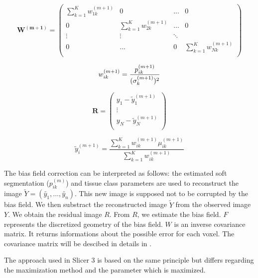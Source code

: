 \begin{itemize}
\begin{itemize}
  \begin{equation*}
   \mathbf{W^{(m+1)}} = \left(
  \begin{array}{clcr}
   \sum_{k=1}^K w_{1k}^{(m+1)} & 0 & \ldots & 0 \\
   0 & \sum_{k=1}^K w_{2k}^{(m+1)} & \ldots & 0 \\
   \vdots & \vdots & \ddots \\
   0 &  \ldots & 0 & \sum_{k=1}^K w_{Nk}^{(m+1)} \\
  \end{array} \right)
  \end{equation*}

  \begin{equation*}
  w_{ik}^{(m+1)}  = \frac{p_{ik}^{(m+1)}}{(\sigma_k^{(m+1)})^2}\\
  \end{equation*}
  
  \begin{equation*}
   \mathbf{R} = \left(
  \begin{array}{cl}
   y_1 - \tilde{y}_1^{(m+1)} \\
   \vdots\\
   y_N - \tilde{y}_N^{(m+1)} \\
  \end{array} \right)
  \end{equation*}
  
  \begin{equation*}
  \tilde{y}_i^{(m+1)}  = \frac{\sum_{k=1}^K w_{ik}^{(m+1)} \mu_{ik}^{(m+1)}}{\sum_{k=1}^K w_{ik}^{(m+1)}}
  \end{equation*}


  \end{itemize}

\end{itemize}

The bias field correction can be interpreted as follows: the estimated soft segmentation ($p_{ik}^{(m)}$) and tissue class parameters are used to reconstruct the image $\tilde{Y}=(\tilde{y_1}, ..., \tilde{y_n})$. This new image is supposed not to be corrupted by the bias field. We then substract the reconstructed image $\tilde{Y}$ from the observed image $Y$. We obtain the residual image $R$. From $R$, we estimate the bias field. $F$ represents the discretized geometry of the bias field. $W$ is an inverse covariance matrix. It returns informations about the possible error for each voxel. The covariance matrix will be descibed in details in \cite{17}.
\par
The approach used in Slicer 3 is based on the same principle but differs regarding the maximization method and the parameter which is maximized.
%
